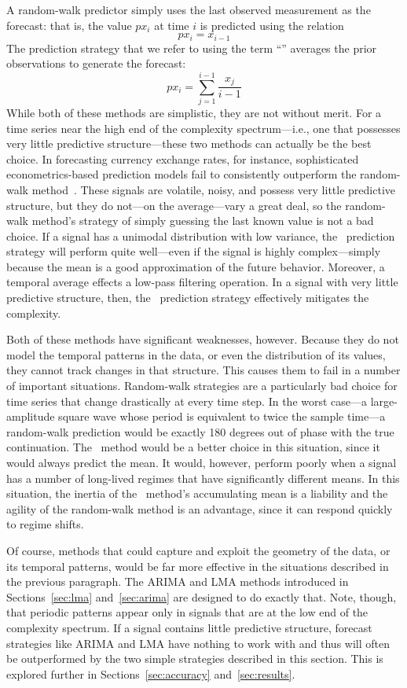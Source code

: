 A random-walk predictor simply uses the last observed measurement as
the forecast: that is, the value $px_i$ at time $i$ is predicted using
the relation $$px_i = x_{i-1}$$ The prediction strategy that we refer
to using the term ``\naive'' averages the prior observations to
generate the forecast: $$px_i = \sum_{j=1}^{i-1}\frac{x_j}{i-1}$$
While both of these methods are simplistic, they are not without
merit.  For a time series near the high end of the complexity
spectrum---i.e., one that possesses very little predictive
structure---these two methods can actually be the best choice.  In
forecasting currency exchange rates, for instance, sophisticated
econometrics-based prediction models fail to consistently outperform
the random-walk method~\cite{rwMeese,rwCCE}.  These signals are
volatile, noisy, and possess very little predictive structure, but
they do not---on the average---vary a great deal, so the random-walk
method's strategy of simply guessing the last known value is not a bad
choice.  If a signal has a unimodal distribution with low variance,
the \naive ~prediction strategy will perform quite well---even if the
signal is highly complex---simply because the mean is a good
approximation of the future behavior.  Moreover, a temporal average
effects a low-pass filtering operation.  In a signal with very little
predictive structure, then, the \naive ~prediction strategy
effectively mitigates the complexity.

Both of these methods have significant weaknesses, however.  Because
they do not model the temporal patterns in the data, or even the
distribution of its values, they cannot track changes in that
structure.  This causes them to fail in a number of important
situations.  Random-walk strategies are a particularly bad choice for
time series that change drastically at every time step.  In the worst
case---a large-amplitude square wave whose period is equivalent to
twice the sample time---a random-walk prediction would be exactly 180
degrees out of phase with the true continuation.  The \naive ~method
would be a better choice in this situation, since it would always
predict the mean.  It would, however, perform poorly when a signal has
a number of long-lived regimes that have significantly different
means.  In this situation, the inertia of the \naive ~method's
accumulating mean is a liability and the agility of the random-walk
method is an advantage, since it can respond quickly to regime shifts.

Of course, methods that could capture and exploit the geometry of the
data, or its temporal patterns, would be far more effective in the
situations described in the previous paragraph.  The ARIMA and LMA
methods introduced in Sections~\ref{sec:lma} and~\ref{sec:arima} are
designed to do exactly that.  Note, though, that periodic patterns
appear only in signals that are at the low end of the complexity
spectrum.  If a signal contains little predictive structure, forecast
strategies like ARIMA and LMA have nothing to work with and thus will
often be outperformed by the two simple strategies described in this
section.  This is explored further in Sections~\ref{sec:accuracy}
and~\ref{sec:results}.


